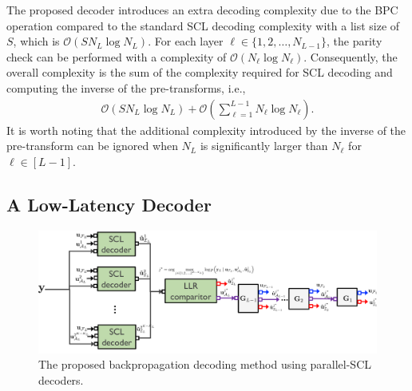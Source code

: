 \documentclass[conference]{IEEEtran}
\begin{document}
    The proposed decoder introduces an extra decoding complexity due to the BPC operation compared to the standard SCL decoding complexity with a list size of $S$, which is $\mathcal{O}(SN_L\log N_L)$. For each layer $\ell\in \{1,2,\ldots, N_{L-1}\}$, the parity check can be performed with a complexity of $\mathcal{O}(N_{\ell}\log N_{\ell})$. Consequently, the overall complexity is the sum of the complexity required for SCL decoding and computing the inverse of the pre-transforms, i.e.,
\begin{align}
	\mathcal{O}(SN_L\log N_L)+ \mathcal{O}\left(\sum_{\ell=1}^{L-1}N_{\ell}\log N_{\ell}\right).
\end{align} 
It is worth noting that the additional complexity introduced by the inverse of the pre-transform can be ignored when $N_L$ is significantly larger than $N_{\ell}$ for $\ell\in[L-1]$.




  \subsection{A Low-Latency Decoder }
  
   \begin{figure}[t]
 \centering
 \includegraphics[width=1.7\columnwidth]{Decoder2.pdf}
 \caption{The proposed backpropagation decoding method using parallel-SCL decoders.}
 \label{fig:decoder-parallel}
 \end{figure}
  
  
  
\end{document}
